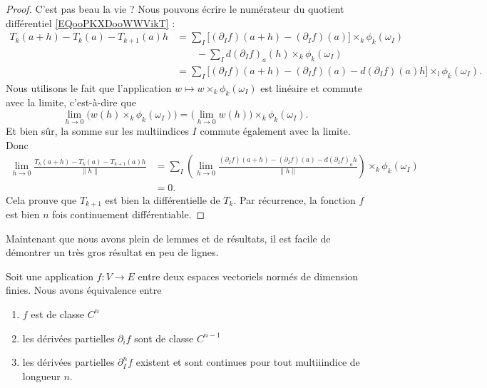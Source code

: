 \begin{proof}
	C'est pas beau la vie ? Nous pouvons écrire le numérateur du quotient différentiel \eqref{EQooPKXDooWWVikT} :
	\begin{subequations}
		\begin{align}
			T_k(a+h)-T_k(a)-T_{k+1}(a)h & =\sum_I\big[ (\partial_If)(a+h)-(\partial_If)(a) \big]\times_k\phi_k(\omega_I)                     \\
			                            & \qquad-\sum_Id(\partial_If)_a(h)\times_k\phi_k(\omega_I)                                           \\
			                            & =\sum_I\big[ (\partial_If)(a+h)-(\partial_If)(a)-d(\partial_If)(a)h \big]\times_l\phi_k(\omega_I).
		\end{align}
	\end{subequations}
	Nous utilisons le fait que l'application \( w\mapsto w\times_k\phi_k(\omega_I)\) est linéaire et commute avec la limite, c'est-à-dire que
	\begin{equation}
		\lim_{h\to 0} \big( w(h)\times_k\phi_k(\omega_I) \big)=\big( \lim_{h\to 0} w(h) \big)\times_k\phi_k(\omega_I).
	\end{equation}
	Et bien sûr, la somme sur les multiindices \( I\) commute également avec la limite. Donc
	\begin{subequations}
		\begin{align}
			\lim_{h\to 0} \frac{ T_k(a+h)-T_k(a)-T_{k+1}(a)h }{ \| h \| } & =\sum_I\left( \lim_{h\to 0} \frac{ (\partial_If)(a+h)-(\partial_If)(a)-d(\partial_If)_ah }{ \| h \| } \right)\times_k\phi_k(\omega_I) \\
			                                                              & =0.
		\end{align}
	\end{subequations}
	Cela prouve que \( T_{k+1}\) est bien la différentielle de \( T_k\). Par récurrence, la fonction \( f\) est bien \( n\) fois continuement différentiable.
\end{proof}

Maintenant que nous avons plein de lemmes et de résultats, il est facile de démontrer un très gros résultat en peu de lignes.

\begin{theorem}     \label{THOooPZTAooTASBhZ}
	Soit une application \( f\colon V\to E\) entre deux espaces vectoriels normés de dimension finies. Nous avons équivalence entre
	\begin{enumerate}
		\item       \label{ITEMooBOWTooXgxhpS}
		      \( f\) est de classe \( C^n\)
		\item       \label{ITEMooPVZHooHihSRD}
		      les dérivées partielles \( \partial_if\) sont de classe \( C^{n-1}\)
		\item       \label{ITEMooVBQMooBleazN}
		      les dérivées partielles \( \partial^n_If\) existent et sont continues pour tout multiiindice de longueur \( n\).
	\end{enumerate}
\end{theorem}


